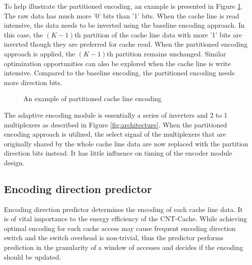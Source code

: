 To help illustrate the partitioned encoding, an example is presented in 
Figure \ref{fig:encode}. The raw data has much more '0' bits than '1' bits.
When the cache line is read intensive, %
the data needs to be inverted using the baseline encoding approach. 
In this case, the $(K-1)$th partition of the cache line data with more '1' bits 
are inverted though they are preferred for cache read. 
When the partitioned encoding approach is applied, the $(K-1)$th 
partition remains unchanged. Similar optimization opportunities can also be explored 
when the cache line is write intensive. Compared to the baseline encoding,
the partitioned encoding needs more direction bits.

\begin{figure}
    \caption{An example of partitioned cache line encoding}
\label{fig:encode}
\vspace{-1em}
\end{figure}

The adaptive encoding module is essentially a series of inverters and 2 to 1 multiplexers
as described in Figure \ref{fig:architecture}.
When the partitioned encoding approach is utilized, the select signal of the multiplexers 
that are originally shared by the whole cache line data are now replaced with the partition 
direction bits instead. It has little influence on timing of the encoder module design. 

\subsection{Encoding direction predictor}
Encoding direction predictor determines the encoding of each cache line data.
It is of vital importance to the energy efficiency of the CNT-Cache.
While achieving optimal encoding for each cache access may cause frequent encoding 
direction switch and the switch overhead is non-trivial, thus the predictor 
performs prediction in the granularity of a window of accesses and decides if the encoding 
should be updated.


